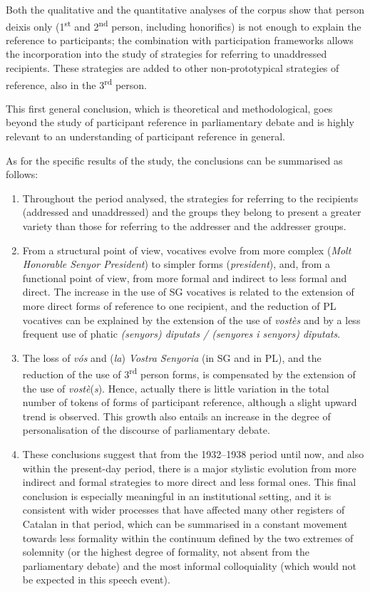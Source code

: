 \documentclass[output=paper]{langscibook}
\begin{document}
Both the qualitative and the quantitative analyses of the corpus show that person deixis only (1\textsuperscript{st} and 2\textsuperscript{nd} person, including honorifics) is not enough to explain the reference to participants; the combination with  participation frameworks allows the incorporation into the study of strategies for referring to unaddressed recipients. These strategies are added to other non-prototypical strategies of reference, also in the 3\textsuperscript{rd} person.

This first general conclusion, which is theoretical and methodological, goes beyond the study of participant reference in parliamentary debate and is highly relevant to an understanding of participant reference in general.

As for the specific results of the study, the conclusions can be summarised as follows:

\begin{enumerate}
\item Throughout the period analysed, the strategies for referring to the recipients (addressed and unaddressed) and the groups they belong to present a greater variety than those for referring to the addresser and the addresser groups.

\item From a structural point of view, vocatives evolve from more complex (\textit{Molt Honorable Senyor President}) to simpler forms (\textit{president}), and, from a functional point of view, from more formal and indirect to less formal and direct. The increase in the use of SG vocatives is related to the extension of more direct forms of reference to one recipient, and the reduction of PL vocatives can be explained by the extension of the use of \textit{vostès} and by a less frequent use of phatic \textit{(senyors) diputats / (senyores i senyors) diputats}.

\item The loss of \textit{vós} and (\textit{la}) \textit{Vostra Senyoria} (in SG and in PL), and the reduction of the use of 3\textsuperscript{rd} person forms, is compensated by the extension of the use of \textit{vostè}(\textit{s}). Hence, actually there is little variation in the total number of tokens of forms of participant reference, although a slight upward trend is observed. This growth also entails an increase in the degree of personalisation of the discourse of parliamentary debate.

\item These conclusions suggest that from the 1932–1938 period until now, and also within the present-day period, there is a major stylistic evolution from more indirect and formal strategies to more direct and less formal ones. This final conclusion is especially meaningful in an institutional setting, and it is consistent with wider processes that have affected many other registers of Catalan in that period, which can be summarised in a constant movement towards less formality within the continuum defined by the two extremes of solemnity (or the highest degree of formality, not absent from the parliamentary debate) and the most informal colloquiality (which would not be expected in this speech event).
\end{enumerate}
\end{document}
